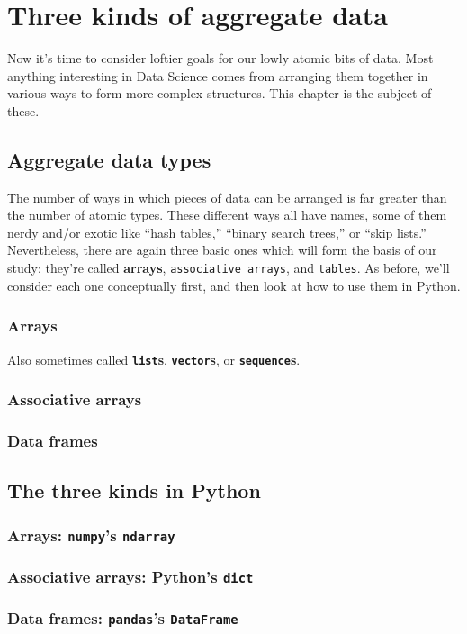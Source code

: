 
%

\chapter{Three kinds of aggregate data}

Now it's time to consider loftier goals for our lowly atomic bits of data. Most
anything interesting in Data Science comes from arranging them together in
various ways to form more complex structures. This chapter is the subject of
these.

\section{Aggregate data types}

The number of ways in which pieces of data can be arranged is far greater than
the number of atomic types. These different ways all have names, some of them
nerdy and/or exotic like ``hash tables,'' ``binary search trees,'' or ``skip
lists.'' Nevertheless, there are again three basic ones which will form the
basis of our study: they're called \textbf{arrays}, \texttt{associative
arrays}, and \texttt{tables}. As before, we'll consider each one conceptually
first, and then look at how to use them in Python.

\subsection{Arrays}

Also sometimes called \textbf{\texttt{list}s}, \textbf{\texttt{vector}s}, or
\textbf{\texttt{sequence}s}.

\subsection{Associative arrays}

\subsection{Data frames}

\section{The three kinds in Python}

\subsection{Arrays: \texttt{numpy}'s \texttt{ndarray}}

\subsection{Associative arrays: Python's \texttt{dict}}

\subsection{Data frames: \texttt{pandas}'s \texttt{DataFrame}}


